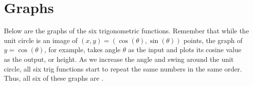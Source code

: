 \documentclass{ximera}
\begin{document}
%		


\section{Graphs}
Below are the graphs of the six trigonometric functions. Remember that while the unit circle is an image of $(x,y)=(\cos(\theta),\sin(\theta))$ points, the graph of $y=\cos(\theta)$, for example, takes angle $\theta$ as the input and plots its cosine value as the output, or height. As we increase the angle and swing around the unit circle, all six trig functions start to repeat the same numbers in the same order. Thus, all six of these graphs are .
\end{document}
